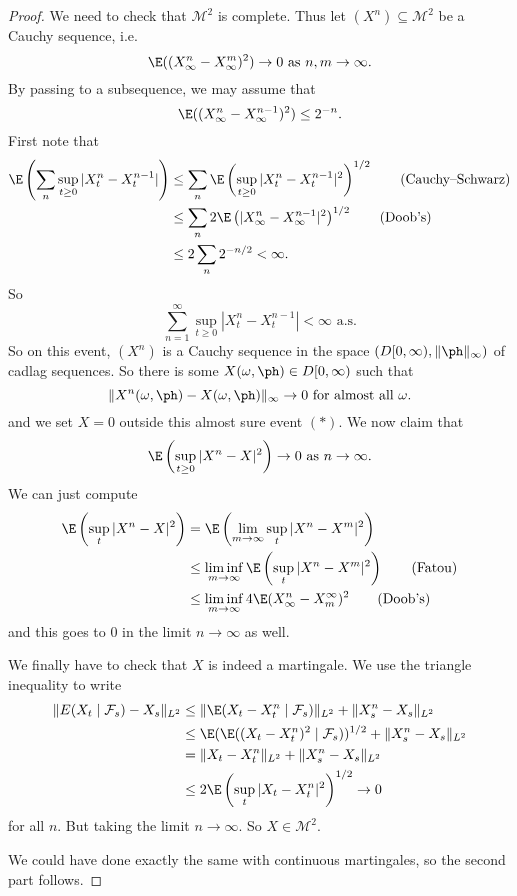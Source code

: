 \documentclass[a4paper]{article}
\begin{document}
\begin{proof}
  We need to check that $\mathcal{M}^2$ is complete. Thus let $(X^n) \subseteq \mathcal{M}^2$ be a Cauchy sequence, i.e.
  \[
    \E((X_\infty^n - X_\infty^m)^2) \to 0\text{ as }n, m \to \infty.
  \]
  By passing to a subsequence, we may assume that
  \[
    \E((X_\infty^n - X_{\infty}^{n - 1})^2) \leq 2^{-n}.
  \]
  First note that
  \begin{align*}
    \E\left(\sum_n \sup_{t \geq 0} |X_t^n - X_t^{n - 1}|\right) &\leq \sum_n \E \left(\sup_{t \geq 0} |X_t^n - X_t^{n - 1}|^2 \right)^{1/2}\tag{Cauchy--Schwarz}\\
    &\leq \sum_n 2 \E \left(|X_\infty^n - X_\infty^{n - 1}|^2\right)^{1/2}\tag{Doob's}\\
    &\leq 2 \sum_n 2^{-n/2} < \infty.
  \end{align*}
  So
  \[
    \sum_{n = 1}^\infty \sup_{t \geq 0} |X_t^n - X_t^{n - 1}|< \infty\text{ a.s.}\tag{$*$}
  \]
  So on this event, $(X^n)$ is a Cauchy sequence in the space $(D[0, \infty), \|\ph\|_\infty)$ of cadlag sequences. So there is some $X(\omega, \ph) \in D[0, \infty)$ such that
  \[
    \|X^n (\omega, \ph) - X(\omega, \ph)\|_\infty \to 0\text{ for almost all }\omega.
  \]
  and we set $X = 0$ outside this almost sure event $(*)$. We now claim that
  \[
    \E \left(\sup_{t \geq 0} |X^n - X|^2\right) \to 0\text{ as }n \to \infty.
  \]
  We can just compute
  \begin{align*}
    \E \left(\sup_t |X^n - X|^2\right) &= \E \left(\lim_{m \to \infty} \sup_t |X^n - X^m|^2\right)\\
    &\leq \liminf_{m \to \infty} \E\left(\sup_t |X^n - X^m|^2\right) \tag{Fatou}\\
    &\leq \liminf_{m \to \infty} 4 \E (X^n_\infty - X_m^\infty)^2 \tag{Doob's}
  \end{align*}
  and this goes to $0$ in the limit $n \to \infty$ as well.

  We finally have to check that $X$ is indeed a martingale. We use the triangle inequality to write
  \begin{align*}
    \|E(X_t \mid \mathcal{F}_s) - X_s \|_{L^2} &\leq \|\E (X_t - X_t^n \mid \mathcal{F}_s)\|_{L^2} + \|X_s^n - X_s\|_{L^2}\\
    &\leq \E (\E ((X_t - X_t^n)^2 \mid \mathcal{F}_s))^{1/2} + \|X_s^n - X_s\|_{L^2}\\
    &= \|X_t - X_t^n\|_{L^2} + \|X_s^n - X_s\|_{L^2}\\
    &\leq 2 \E\left(\sup_t |X_t - X_t^n|^2\right)^{1/2} \to 0
  \end{align*}
  for all $n$. But taking the limit $n \to \infty$. So $X \in \mathcal{M}^2$.

  We could have done exactly the same with continuous martingales, so the second part follows.
\end{proof}
\end{document}
